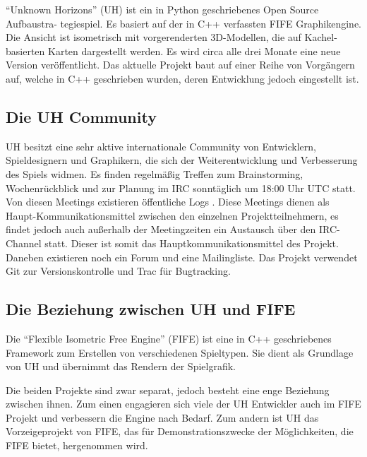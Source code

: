 \enquote{Unknown Horizons} (UH) ist ein in Python geschriebenes Open Source Aufbaustra-
tegiespiel. Es basiert auf der in C++
verfassten FIFE Graphikengine. Die Ansicht ist isometrisch mit vorgerenderten 3D-Modellen,
die auf Kachel-basierten Karten dargestellt werden. Es wird circa alle drei Monate eine neue Version
veröffentlicht. Das aktuelle Projekt baut auf einer Reihe von Vorgängern auf, welche
in C++ geschrieben wurden, deren Entwicklung jedoch eingestellt ist.

\subsection{Die UH Community}
UH besitzt eine sehr aktive internationale Community von Entwicklern, Spieldesignern und Graphikern, die
sich der Weiterentwicklung und Verbesserung des Spiels widmen.
Es finden regelmäßig Treffen zum Brainstorming, Wochenrückblick
und zur Planung im IRC sonntäglich um 18:00 Uhr UTC statt. Von diesen Meetings
existieren öffentliche Logs \cite{uhlogs}.
Diese Meetings dienen als Haupt-Kommunikationsmittel zwischen den einzelnen Projektteilnehmern,
es findet jedoch auch außerhalb der Meetingzeiten ein Austausch über den  IRC-Channel statt.
Dieser ist somit das
Hauptkommunikationsmittel des Projekt. Daneben existieren noch ein Forum
und eine Mailingliste. Das Projekt verwendet Git zur Versionskontrolle und Trac für
Bugtracking.

\subsection{Die Beziehung zwischen UH und FIFE}
Die \enquote{Flexible Isometric Free Engine} (FIFE) \cite{fife} ist eine in C++ geschriebenes Framework
zum Erstellen von verschiedenen Spieltypen. Sie dient als Grundlage von UH und übernimmt das Rendern
der Spielgrafik.

Die beiden Projekte sind zwar separat, jedoch besteht eine enge Beziehung zwischen ihnen. Zum einen
engagieren sich viele der UH Entwickler auch im FIFE Projekt und verbessern die Engine nach Bedarf.
Zum andern ist UH das Vorzeigeprojekt von FIFE, das für Demonstrationszwecke der
Möglichkeiten, die FIFE bietet, hergenommen wird.

